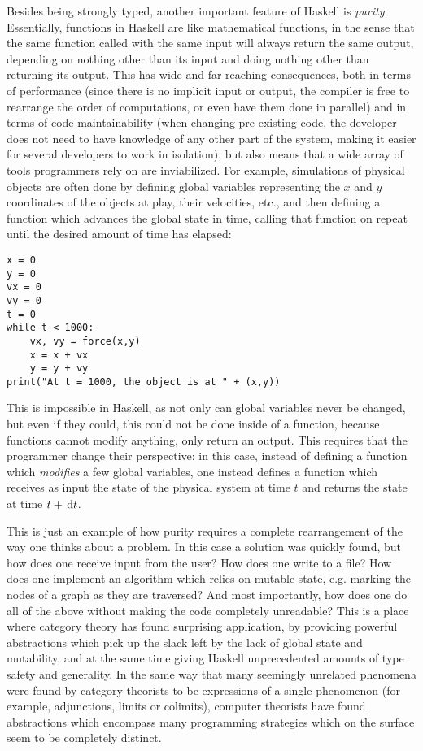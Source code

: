 \documentclass[11	pt]{article}
\theoremstyle{nonumberplain}
\begin{document}
Besides being strongly typed, another important feature of Haskell is \emph{purity}. Essentially, functions in Haskell are like mathematical functions, in the sense that the same function called with the same input will always return the same output, depending on nothing other than its input and doing nothing other than returning its output. This has wide and far-reaching consequences, both in terms of performance (since there is no implicit input or output, the compiler is free to rearrange the order of computations, or even have them done in parallel) and in terms of code maintainability (when changing pre-existing code, the developer does not need to have knowledge of any other part of the system, making it easier for several developers to work in isolation), but also means that a wide array of tools programmers rely on are inviabilized. For example, simulations of physical objects are often done by defining global variables representing the $x$ and $y$ coordinates of the objects at play, their velocities, etc., and then defining a function which advances the global state in time, calling that function on repeat until the desired amount of time has elapsed:
\begin{lstlisting}
x = 0
y = 0
vx = 0
vy = 0
t = 0
while t < 1000:
	vx, vy = force(x,y)
	x = x + vx
	y = y + vy
print("At t = 1000, the object is at " + (x,y))
\end{lstlisting}

This is impossible in Haskell, as not only can global variables never be changed, but even if they could, this could not be done inside of a function, because functions cannot modify anything, only return an output. This requires that the programmer change their perspective: in this case, instead of defining a function which \emph{modifies} a few global variables, one instead defines a function which receives as input the state of the physical system at time $t$ and returns the state at time $t + \dl t$. 

This is just an example of how purity requires a complete rearrangement of the way one thinks about a problem. In this case a solution was quickly found, but how does one receive input from the user? How does one write to a file? How does one implement an algorithm which relies on mutable state, e.g. marking the nodes of a graph as they are traversed? And most importantly, how does one do all of the above without making the code completely unreadable? This is a place where category theory has found surprising application, by providing powerful abstractions which pick up the slack left by the lack of global state and mutability, and at the same time giving Haskell unprecedented amounts of type safety and generality. In the same way that many seemingly unrelated phenomena were found by category theorists to be expressions of a single phenomenon (for example, adjunctions, limits or colimits), computer theorists have found abstractions which encompass many programming strategies which on the surface seem to be completely distinct.
\end{document}
